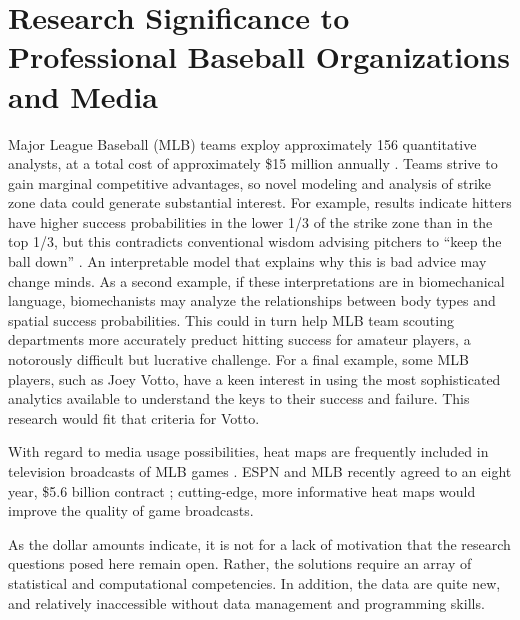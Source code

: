 \section{Research Significance to Professional Baseball Organizations and Media}

Major League Baseball (MLB\textsuperscript{\textregistered}) teams exploy approximately 156 quantitative analysts, at a total cost of approximately \$15 million annually \citep{Lindbergh2016}. Teams strive to gain marginal competitive advantages, so novel modeling and analysis of strike zone data could generate substantial interest. For example, results indicate hitters have higher success probabilities in the lower 1/3 of the strike zone than in the top 1/3, but this contradicts conventional wisdom advising pitchers to ``keep the ball down'' \citep{Stallings2003}. An interpretable model that explains why this is bad advice may change minds. As a second example, if these interpretations are in biomechanical language, biomechanists may analyze the relationships between body types and spatial success probabilities. This could in turn help MLB\textsuperscript{\textregistered} team scouting departments more accurately preduct hitting success for amateur players, a notorously difficult but lucrative challenge. For a final example, some MLB\textsuperscript{\textregistered} players, such as Joey Votto, have a keen interest in using the most sophisticated analytics available to understand the keys to their success and failure\citep{Daugherty2015}. This research would fit that criteria for Votto.

With regard to media usage possibilities, heat maps are frequently included in television broadcasts of MLB\textsuperscript{\textregistered} games \citep{Cross2015}. ESPN\textsuperscript{\textregistered} and MLB\textsuperscript{\textregistered} recently agreed to an eight year, \$5.6 billion contract \citep{Newman2012}; cutting-edge, more informative heat maps would improve the quality of game broadcasts.

As the dollar amounts indicate, it is not for a lack of motivation that the research questions posed here remain open. Rather, the solutions require an array of statistical and computational competencies. In addition, the data are quite new, and relatively inaccessible without data management and programming skills.



